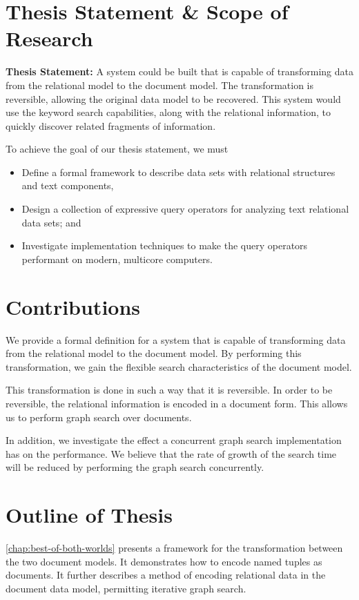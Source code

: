 	\section{Thesis Statement \& Scope of Research}
		\begin{displayquote}
			\textbf{Thesis Statement:}  A system could be built that is capable of transforming data from the relational model to the document model.  The transformation is reversible, allowing the original data model to be recovered.  This system would use the keyword search capabilities, along with the relational information, to quickly discover related fragments of information.
		\end{displayquote}
		
		To achieve the goal of our thesis statement, we must
		
		\begin{itemize}
			\item Define a formal framework to describe data sets with relational structures and text components,
			\item Design a collection of expressive query operators for analyzing text relational data sets; and
			\item Investigate implementation techniques to make the query operators performant on modern, multicore computers.
		\end{itemize}
		
	 \section{Contributions}
	 	We provide a formal definition for a system that is capable of transforming data from the relational model to the document model.  By performing this transformation, we gain the flexible search characteristics of the document model.
	 	
	 	This transformation is done in such a way that it is reversible.  In order to be reversible, the relational information is encoded in a document form.  This allows us to perform graph search over documents.
	 	
	 	In addition, we investigate the effect a concurrent graph search implementation has on the performance.  We believe that the rate of growth of the search time will be reduced by performing the graph search concurrently.
	
	\section{Outline of Thesis}
		\cref{chap:best-of-both-worlds} presents a framework for the transformation between the two document models.  It demonstrates how to encode named tuples as documents.  It further describes a method of encoding relational data in the document data model, permitting iterative graph search.
		
